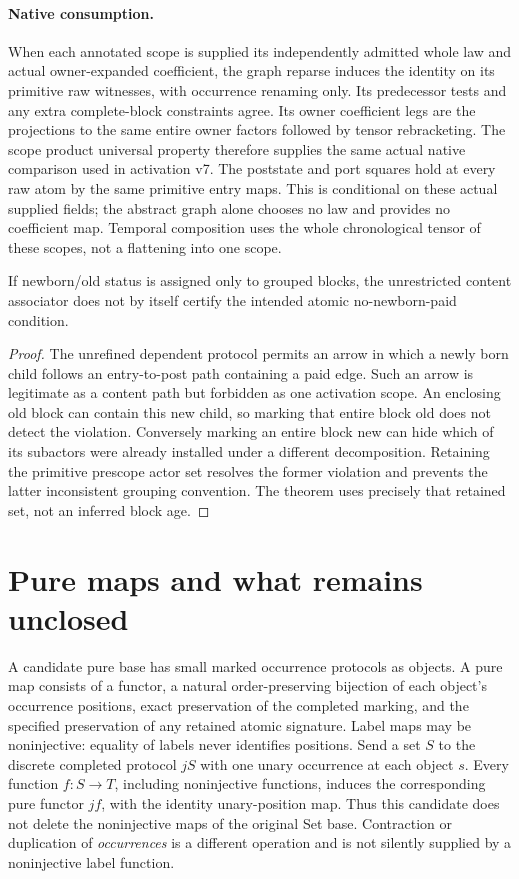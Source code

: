 \documentclass[11pt]{article}
\begin{document}
\paragraph{Native consumption.}
When each annotated scope is supplied its independently admitted whole law and actual owner-expanded coefficient, the graph reparse induces the identity on its primitive raw witnesses, with occurrence renaming only. Its predecessor tests and any extra complete-block constraints agree. Its owner coefficient legs are the projections to the same entire owner factors followed by tensor rebracketing. The scope product universal property therefore supplies the same actual native comparison used in activation v7. The poststate and port squares hold at every raw atom by the same primitive entry maps. This is conditional on these actual supplied fields; the abstract graph alone chooses no law and provides no coefficient map. Temporal composition uses the whole chronological tensor of these scopes, not a flattening into one scope.

\begin{proposition}
If newborn/old status is assigned only to grouped blocks, the unrestricted content associator does not by itself certify the intended atomic no-newborn-paid condition.
\end{proposition}
\begin{proof}
The unrefined dependent protocol permits an arrow in which a newly born child follows an entry-to-post path containing a paid edge. Such an arrow is legitimate as a content path but forbidden as one activation scope. An enclosing old block can contain this new child, so marking that entire block old does not detect the violation. Conversely marking an entire block new can hide which of its subactors were already installed under a different decomposition. Retaining the primitive prescope actor set resolves the former violation and prevents the latter inconsistent grouping convention. The theorem uses precisely that retained set, not an inferred block age.\end{proof}

\section{Pure maps and what remains unclosed}
A candidate pure base has small marked occurrence protocols as objects. A pure map consists of a functor, a natural order-preserving bijection of each object's occurrence positions, exact preservation of the completed marking, and the specified preservation of any retained atomic signature. Label maps may be noninjective: equality of labels never identifies positions. Send a set $S$ to the discrete completed protocol $jS$ with one unary occurrence at each object $s$. Every function $f:S\to T$, including noninjective functions, induces the corresponding pure functor $jf$, with the identity unary-position map. Thus this candidate does not delete the noninjective maps of the original Set base. Contraction or duplication of \emph{occurrences} is a different operation and is not silently supplied by a noninjective label function.
\end{document}
